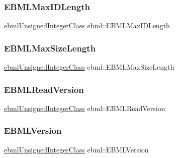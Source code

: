 \subsubsection{\texorpdfstring{E\+B\+M\+L\+Max\+I\+D\+Length}{EBMLMaxIDLength}}
{\footnotesize\ttfamily \mbox{\hyperlink{namespaceebml_a506b246c5594e5d0322c3c05e9820fd2}{ebml\+Unsigned\+Integer\+Class}} ebml\+::\+E\+B\+M\+L\+Max\+I\+D\+Length}

\mbox{\label{namespaceebml_a2f4a3ca0aa5867e5024d72b48328ee65}} 
\subsubsection{\texorpdfstring{E\+B\+M\+L\+Max\+Size\+Length}{EBMLMaxSizeLength}}
{\footnotesize\ttfamily \mbox{\hyperlink{namespaceebml_a506b246c5594e5d0322c3c05e9820fd2}{ebml\+Unsigned\+Integer\+Class}} ebml\+::\+E\+B\+M\+L\+Max\+Size\+Length}

\mbox{\label{namespaceebml_ae2a831962d9fe406ade51a61f4d7f44f}} 
\subsubsection{\texorpdfstring{E\+B\+M\+L\+Read\+Version}{EBMLReadVersion}}
{\footnotesize\ttfamily \mbox{\hyperlink{namespaceebml_a506b246c5594e5d0322c3c05e9820fd2}{ebml\+Unsigned\+Integer\+Class}} ebml\+::\+E\+B\+M\+L\+Read\+Version}

\mbox{\label{namespaceebml_ab043f0427daa3a4eb36615002a603c2f}} 
\subsubsection{\texorpdfstring{E\+B\+M\+L\+Version}{EBMLVersion}}
{\footnotesize\ttfamily \mbox{\hyperlink{namespaceebml_a506b246c5594e5d0322c3c05e9820fd2}{ebml\+Unsigned\+Integer\+Class}} ebml\+::\+E\+B\+M\+L\+Version}

\mbox{\label{namespaceebml_a137fb22cbfb98d4e7bd6367064078bee}} 
